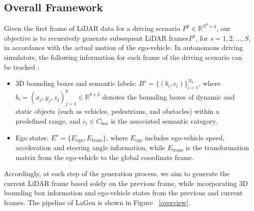 \subsection{Overall Framework}
Given the first frame of LiDAR data for a driving scenario \( P^{0} \in \mathbb{R}^{N^{0} \times 4} \), our objective is to recursively generate subsequent LiDAR frames\( P^{s} \), for \( s = 1, 2, \ldots, S \), in accordance with the actual motion of the ego-vehicle.
In autonomous driving simulators, the following information for each frame of the driving scenario can be tracked \cite{karnchanachari2024towards}:
\begin{itemize}[leftmargin=*]
\item 3D bounding boxes and semantic labels: \( B^{s} = \{(b_{i}, c_{i})\}_{i = 1}^{N_{b}} \), where \( b_{i} = (x_{j}, y_{j}, z_{j})_{j = 1}^{8} \in \mathbb{R}^{8 \times 3} \) denotes the bounding boxes of dynamic and static objects (such as vehicles, pedestrians, and obstacles) within a predefined range, and \( c_{i} \in C_{box} \) is the associated semantic category.
\item Ego states: \( E^{s} = \{E_{\text{ego}},E_{\text{trans}}\} \), where \( E_{\text{ego}} \) includes ego-vehicle speed, acceleration and steering angle information, while \( E_{\text{trans}} \) is the transformation matrix from the ego-vehicle to the global coordinate frame.
\end{itemize} 
Accordingly, at each step of the generation process, we aim to generate the current LiDAR frame based solely on the previous frame, while incorporating 3D bounding box information and ego-vehicle states from the previous and current frames. 
The pipeline of LaGen is shown in Figure ~\ref{overview}.

